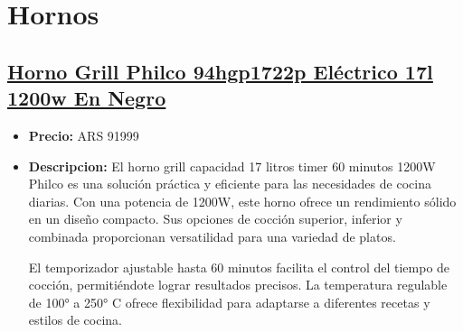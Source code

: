 \documentclass{article}
\begin{document}
    
    \section*{Hornos}
    \setcounter{subsection}{0} %
    
    \begin{adjustwidth}{2em}{}

    \subsection{\underline{\href{https://www.mercadolibre.com.ar/horno-grill-philco-94hgp1722p-electrico-17l-1200w-en-negro/p/MLA27820218}{Horno Grill Philco 94hgp1722p Eléctrico 17l 1200w En Negro}}}
    \begin{itemize}
        \item \textbf{Precio:} ARS 91999
        \item \textbf{Descripcion:} El horno grill capacidad 17 litros timer 60 minutos 1200W Philco es una solución práctica y eficiente para las necesidades de cocina diarias. Con una potencia de 1200W, este horno ofrece un rendimiento sólido en un diseño compacto. Sus opciones de cocción superior, inferior y combinada proporcionan versatilidad para una variedad de platos.

El temporizador ajustable hasta 60 minutos facilita el control del tiempo de cocción, permitiéndote lograr resultados precisos. La temperatura regulable de 100° a 250° C ofrece flexibilidad para adaptarse a diferentes recetas y estilos de cocina.


\end{itemize}
\end{adjustwidth}
\end{document}
